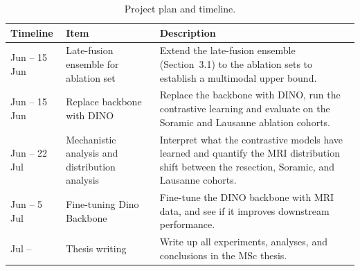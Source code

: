 \documentclass[12pt,twoside]{report}
\begin{document}
\begin{table}[ht]
\centering
\caption{Project plan and timeline.}
\label{tab:project_plan}
\begin{tabular}{>{\raggedright\arraybackslash}p{2.8cm}>{\raggedright\arraybackslash}p{4.2cm}>{\raggedright\arraybackslash}p{6.5cm}}
\hline
\textbf{Timeline} & \textbf{Item} & \textbf{Description} \\
\hline
8 Jun -- 15 Jun &
Late-fusion ensemble for ablation set &
Extend the late-fusion ensemble (Section~3.1) to the ablation sets to establish a multimodal upper bound. \\[0.4em]

8 Jun -- 15 Jun &
Replace backbone with DINO &
Replace the backbone with DINO, run the contrastive learning and evaluate on the Soramic and Lausanne ablation cohorts. \\[0.4em]


15 Jun -- 22 Jul &
Mechanistic analysis and distribution analysis &
Interpret what the contrastive models have learned and quantify the MRI distribution shift between the resection, Soramic, and Lausanne cohorts. \\[0.4em]


15 Jun -- 5 Jul &
Fine-tuning Dino Backbone &
Fine-tune the DINO backbone with MRI data, and see if it improves downstream performance. \\[0.4em]

6 Jul -- &
Thesis writing &
Write up all experiments, analyses, and conclusions in the MSc thesis. \\
\hline
\end{tabular}
\end{table}



\renewcommand{\bibname}{References}

\end{document}
